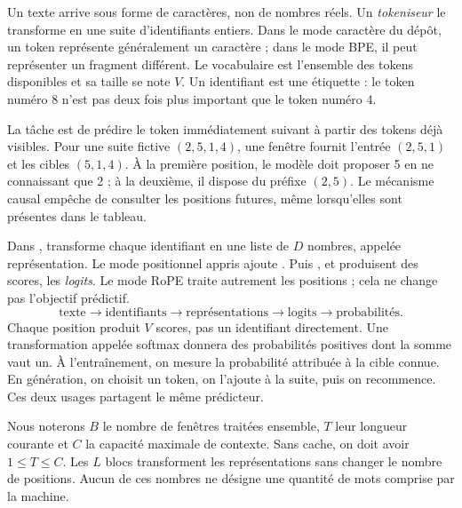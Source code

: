 
Un texte arrive sous forme de caractères, non de nombres réels. Un
\emph{tokeniseur} le transforme en une suite d'identifiants entiers. Dans le
mode caractère du dépôt, un token représente généralement un caractère ;
dans le mode BPE, il peut représenter un fragment différent. Le vocabulaire
est l'ensemble des tokens disponibles et sa taille se note \(V\). Un
identifiant est une étiquette : le token numéro 8 n'est pas deux fois
plus important que le token numéro 4.

La tâche est de prédire le token immédiatement suivant à partir des tokens
déjà visibles. Pour une suite fictive \((2,5,1,4)\), une fenêtre fournit
l'entrée \((2,5,1)\) et les cibles \((5,1,4)\). À la première position,
le modèle doit proposer 5 en ne connaissant que 2 ; à la deuxième,
il dispose du préfixe \((2,5)\). Le mécanisme causal empêche de consulter
les positions futures, même lorsqu'elles sont présentes dans le tableau.

Dans ,  transforme chaque
identifiant en une liste de \(D\) nombres, appelée représentation.
Le mode positionnel appris ajoute . Puis
,  et  produisent des scores,
les \emph{logits}. Le mode RoPE traite autrement les positions ; cela
ne change pas l'objectif prédictif.
\[
 \text{texte}\longrightarrow\text{identifiants}
 \longrightarrow\text{représentations}
 \longrightarrow\text{logits}\longrightarrow\text{probabilités}.
\]
Chaque position produit \(V\) scores, pas un identifiant directement.
Une transformation appelée softmax donnera des probabilités positives
dont la somme vaut un. À l'entraînement, on mesure la probabilité attribuée
à la cible connue. En génération, on choisit un token, on l'ajoute à la
suite, puis on recommence. Ces deux usages partagent le même prédicteur.

Nous noterons \(B\) le nombre de fenêtres traitées ensemble, \(T\) leur
longueur courante et \(C\) la capacité maximale de contexte. Sans cache,
on doit avoir \(1\leq T\leq C\). Les \(L\) blocs transforment les
représentations sans changer le nombre de positions. Aucun de ces nombres
ne désigne une quantité de mots comprise par la machine.



